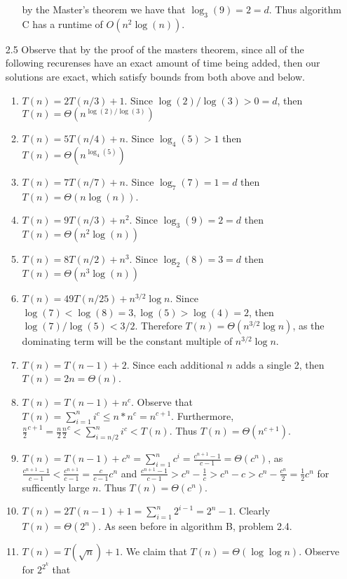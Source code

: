 \documentclass[12pt, letterpaper]{article}
\begin{document}
\begin{enumerate}
\begin{itemize}
		by the Master's theorem we have that $\log_3(9) = 2 = d$.  Thus algorithm
		C has a runtime of $O(n^2 \log(n))$.  
	\end{itemize}
	\item[2.5] Observe that by the proof of the masters theorem, since all of the following 
	recurenses have an exact amount of time being added, then our solutions are exact, which 
	satisfy bounds from both above and below.  
	\begin{enumerate}
		\item $T(n) = 2T(n/3) + 1$.  Since $\log(2)/\log(3) > 0 = d$, then $T(n) = \Theta(n^{\log(2)/\log(3)})$
		\item $T(n) = 5T(n/4) + n$.  Since 
		$\log_4(5) > 1$ then $T(n) = \Theta(n^{\log_4(5)})$
		\item $T(n) = 7T(n/7) + n$.  Since
		$\log_7(7) = 1 = d$ then 
		$T(n) = \Theta(n \log (n))$.
		\item $T(n) = 9T(n/3) + n^2$.  
		Since $\log_3(9) = 2 = d$ then 
		$T(n) = \Theta(n^2 \log(n))$
		\item $T(n) = 8T(n/2) + n^3$.  
		Since $\log_2(8) = 3 = d$ then 
		$T(n) = \Theta(n^3 \log(n))$
		\item $T(n) = 49T(n/25) + n^{3/2}\log n$.  
		Since $\log(7) < \log(8) = 3, 
		\log(5) > \log(4) = 2$, then $\log(7)/\log(5) <
		3/2$.  Therefore $T(n) = \Theta(n^{3/2}\log n)$,
		as the dominating term will be the constant 
		multiple of $n^{3/2} \log n$.  
		\item $T(n) = T(n-1) + 2$.  Since each 
		additional $n$ adds a single 2, then 
		$T(n) = 2n = \Theta(n)$.  
		\item $T(n) = T(n-1) + n^c$.  
		Observe that 
		$T(n) = \sum_{i=1}^n i^c \leq n*n^c = n^{c+1}$. 
		Furthermore, 
		$\frac{n}{2}^{c+1}  =\frac{n}{2}\frac{n}{2}^{c} < \sum_{i=n/2}^n i^c < T(n)$.  Thus 
		$T(n) = \Theta(n^{c+1})$. 
		\item
		$T(n) = T(n-1) + c^n = \sum_{i=1}^n c^i = 
		\frac{c^{n+1} - 1}{c - 1} = \Theta(c^{n})$, as 
		$\frac{c^{n+1} - 1}{c-1} < \frac{c^{n+1}}{c-1} = \frac{c}{c-1}c^n$ and 
		$\frac{c^{n+1} - 1}{c-1} > c^n - \frac{1}{c} > c^n - c > c^n - 
		\frac{c^n}{2} = \frac{1}{2}c^n$ for sufficently large $n$.  
		Thus $T(n) = \Theta(c^n)$.  
		\item $T(n) = 2T(n-1) + 1 = \sum_{i=1}^n 2^{i-1} = 2^{n} - 1$.
		Clearly $T(n) = \Theta(2^n)$.  As seen before in algorithm B, 
		problem 2.4.  
		\item $T(n) = T(\sqrt{n}) + 1$.  We claim that 
		$T(n) = \Theta(\log \log n)$.  Observe for $2^{2^k}$ that 

\end{enumerate}
\end{enumerate}
\end{document}
